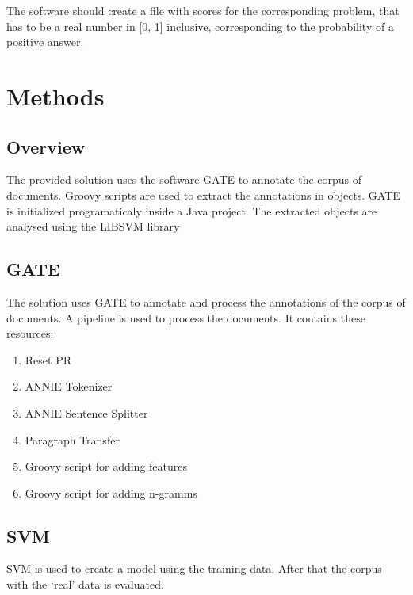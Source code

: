 \documentclass{llncs}
\begin{document}
The software should create a file with scores for the corresponding problem, that has to be a real number in [0, 1] inclusive, corresponding to the probability of a positive answer.




\section{Methods}

\subsection{Overview}

The provided solution uses the software GATE \cite{Cunningham2011a} to annotate the corpus of documents. Groovy scripts are used to extract the annotations in objects. GATE is initialized programaticaly inside a Java project. The extracted objects are analysed using the LIBSVM library \cite{CC01a} 

\subsection {GATE}
The solution uses GATE to annotate and process the annotations of the corpus of documents. A pipeline is used to process the documents. It contains these resources:

\begin{enumerate}
\item Reset PR 
\item ANNIE Tokenizer \cite{Cunningham2002}
\item ANNIE Sentence Splitter
\item Paragraph Transfer
\item Groovy script for adding features
\item Groovy script for adding n-gramms
\end{enumerate}

\subsection {SVM}

SVM is used to create a model using the training data. After that the corpus with the `real' data is evaluated.
\end{document}
